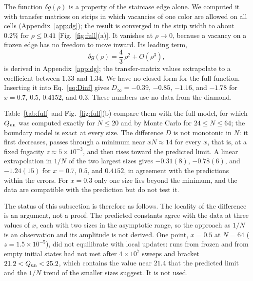 \documentclass[reprint,aps,pre,superscriptaddress,longbibliography,floatfix,amsmath,amssymb]{revtex4-2}
\newcommand{\Qun}{Q_{\rm un}}
\begin{document}
The function $\delta g(\rho)$ is a property of the staircase edge alone. We computed it with transfer matrices on strips in which vacancies of one color are allowed on all cells (Appendix~\ref{app:dg}); the result is converged in the strip width to about $0.2\%$ for $\rho\le0.41$ [Fig.~\ref{fig:full}(a)]. It vanishes at $\rho\to0$, because a vacancy on a frozen edge has no freedom to move inward. Its leading term,
\begin{equation}\label{eq:dglead}
  \delta g(\rho)=\frac43\,\rho^2+O(\rho^3),
\end{equation}
is derived in Appendix~\ref{app:dg}; the transfer-matrix values extrapolate to a coefficient between $1.33$ and $1.34$. We have no closed form for the full function. Inserting it into Eq.~\eqref{eq:Dinf} gives $D_\infty=-0.39$, $-0.85$, $-1.16$, and $-1.78$ for $x=0.7$, $0.5$, $0.4152$, and $0.3$. These numbers use no data from the diamond.

Table~\ref{tab:full} and Fig.~\ref{fig:full}(b) compare them with the full model, for which $\Qun$ was computed exactly for $N\le20$ and by Monte Carlo for $24\le N\le64$; the boundary model is exact at every size. The difference $D$ is not monotonic in $N$: it first decreases, passes through a minimum near $xN\approx14$ for every $x$, that is, at a fixed fugacity $z\approx5\times10^{-3}$, and then rises toward the predicted limit. A linear extrapolation in $1/N$ of the two largest sizes gives $-0.31(8)$, $-0.78(6)$, and $-1.24(15)$ for $x=0.7$, $0.5$, and $0.4152$, in agreement with the predictions within the errors. For $x=0.3$ only one size lies beyond the minimum, and the data are compatible with the prediction but do not test it.

The status of this subsection is therefore as follows. The locality of the difference is an argument, not a proof. The predicted constants agree with the data at three values of $x$, each with two sizes in the asymptotic range, so the approach as $1/N$ is an observation and its amplitude is not derived. One point, $x=0.5$ at $N=64$ ($z=1.5\times10^{-5}$), did not equilibrate with local updates: runs from frozen and from empty initial states had not met after $4\times10^{7}$ sweeps and bracket $21.2<\Qun<25.2$, which contains the value near $21.4$ that the predicted limit and the $1/N$ trend of the smaller sizes suggest. It is not used.
\end{document}
